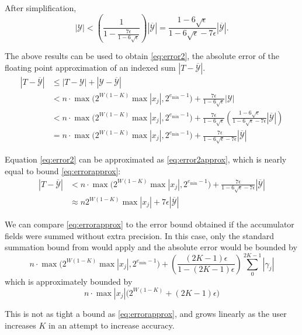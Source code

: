     After simplification,
    \[
      |\mathcal{Y}| < \left(\frac{1}{1 - \frac{7\epsilon}{1 - 6\sqrt\epsilon}}\right)  \left|\overline{\mathcal{Y}}\right| \nonumber 
      = \frac{1 - 6 \sqrt\epsilon}{1 - 6 \sqrt \epsilon - 7\epsilon}  \left|\overline{\mathcal{Y}}\right|.
    \]

    The above results can be used to obtain  \eqref{eq:error2}, the absolute
    error of the floating point approximation of an indexed sum $|T -
    \overline{\mathcal{Y}}|$.
    \begin{align}
      \left|T - \overline{\mathcal{Y}}\right| &\leq |T - \mathcal{Y}| + \left|\mathcal{Y} - \overline{\mathcal{Y}}\right| \nonumber \\
      &< n \cdot \max\bigl(2^{W(1-K)}  \max|x_j|, 2^{e_{\min} - 1}\bigr) + \frac{7\epsilon}{1 - 6\sqrt\epsilon}|\mathcal{Y}| \nonumber \\
      &< n \cdot \max\bigl(2^{W(1-K)}  \max|x_j|, 2^{e_{\min} - 1}\bigr) + \frac{7\epsilon}{1 - 6\sqrt\epsilon}\left(\frac{1 - 6 \sqrt\epsilon}{1 - 6 \sqrt \epsilon - 7\epsilon}\left|\overline{\mathcal{Y}}\right|\right) \nonumber \\
      &= n \cdot \max\bigl(2^{W(1-K)}  \max|x_j|, 2^{e_{\min} - 1}\bigr) + \frac{7\epsilon}{1 - 6 \sqrt \epsilon - 7\epsilon}\left|\overline{\mathcal{Y}}\right|
      \label{eq:error2}
    \end{align}

    Equation \eqref{eq:error2} can be approximated as \eqref{eq:error2approx},
    which is nearly equal to bound \eqref{eq:errorapprox}:
    \begin{align}
      |T - \overline{\mathcal{Y}}| &< n \cdot \max\bigl(2^{W(1-K)}  \max|x_j|, 2^{e_{\min} - 1}\bigr) + \frac{7\epsilon}{1 - 6 \sqrt \epsilon - 7\epsilon}  \left|\overline{\mathcal{Y}}\right| \nonumber \\
      &\approx n  2^{W(1 - K)} \max|x_j|+ 7 \epsilon \left|\overline{\mathcal{Y}}\right|
      \label{eq:error2approx}
    \end{align}

    We can compare  \eqref{eq:errorapprox} to the error bound obtained if the
    accumulator fields were summed without extra precision. In this case, only
    the standard summation bound from \cite{higham} would apply and the
    absolute error would be bounded by
    \begin{equation*}
    n \cdot \max\bigl(2^{W(1-K)}  \max|x_j|, 2^{e_{\min} - 1}\bigr) + \left(\frac{(2  K - 1)  \epsilon}{1 - (2  K - 1)  \epsilon}\right)  \sum\limits_0^{2  K - 1}|\gamma_j|
    \end{equation*}
    which is approximately bounded by
    \begin{equation}
    n \cdot \max|x_j| \bigl(2^{W(1-K)} + (2  K - 1)  \epsilon\bigr)
    \label{eq:baderrorapprox}
    \end{equation}

    This is not as tight a bound as \eqref{eq:errorapprox}, and grows linearly
    as the user increases $K$ in an attempt to increase accuracy.

